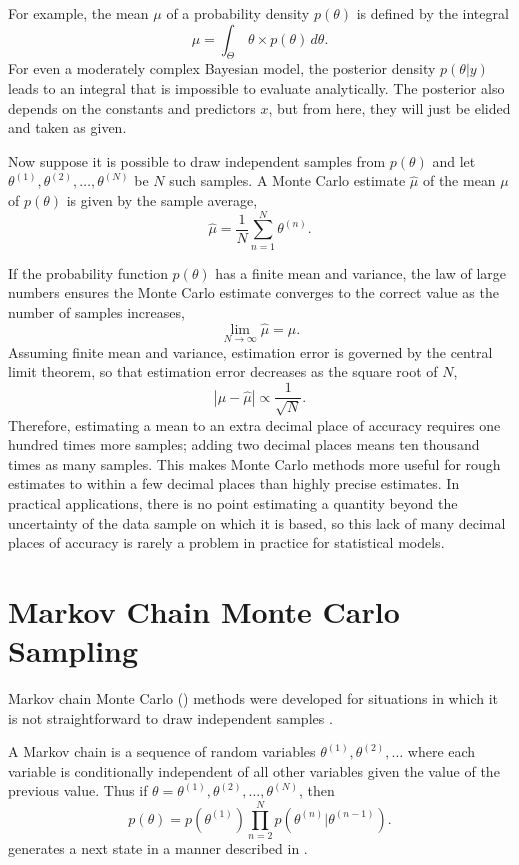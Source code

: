 For example, the mean $\mu$ of a probability density $p(\theta)$ is
defined by the integral
\[
\mu = \int_{\Theta} \, \theta \times p(\theta) \, d\theta.
\]
For even a moderately complex Bayesian model, the posterior density
$p(\theta|y)$ leads to an integral that is impossible to evaluate
analytically.  The posterior also depends on the constants and
predictors $x$, but from here, they will just be elided and taken as
given.

Now suppose it is possible to draw independent samples from
$p(\theta)$ and let $\theta^{(1)},\theta^{(2)},\ldots,\theta^{(N)}$ be
$N$ such samples.  A Monte Carlo estimate $\hat{\mu}$ of the mean
$\mu$ of $p(\theta)$ is given by the sample average,
\[
\hat{\mu} = \frac{1}{N} \sum_{n=1}^N \theta^{(n)}.
\]

If the probability function $p(\theta)$ has a finite mean and
variance, the law of large numbers ensures the Monte Carlo estimate
converges to the correct value as the number of samples increases,
\[
\lim_{N \rightarrow \infty} \hat{\mu} = \mu.
\]
Assuming finite mean and variance, estimation error is governed by the
central limit theorem, so that estimation error decreases as the
square root of $N$,
\[
|\mu - \hat{\mu}| \propto \frac{1}{\sqrt{N}}.
\]
Therefore, estimating a mean to an extra decimal place of accuracy
requires one hundred times more samples; adding two decimal places
means ten thousand times as many samples.  This makes Monte Carlo
methods more useful for rough estimates to within a few decimal places
than highly precise estimates.  In practical applications, there is no
point estimating a quantity beyond the uncertainty of the data sample
on which it is based, so this lack of many decimal places of accuracy
is rarely a problem in practice for statistical models.


\section{Markov Chain Monte Carlo Sampling}

Markov chain Monte Carlo (\MCMC) methods were developed for situations
in which it is not straightforward to draw independent samples
\citep{Metropolis:1953}.

A Markov chain is a sequence of random variables $\theta^{(1)},
\theta^{(2)},\ldots$ where each variable is conditionally independent
of all other variables given the value of the previous value.  Thus if
$\theta = \theta^{(1)}, \theta^{(2)},\ldots, \theta^{(N)}$, then
\[
p(\theta) = p(\theta^{(1)}) \prod_{n=2}^N p(\theta^{(n)}|\theta^{(n-1)}).
\]
\Stan generates a next state in a manner described in
. 

